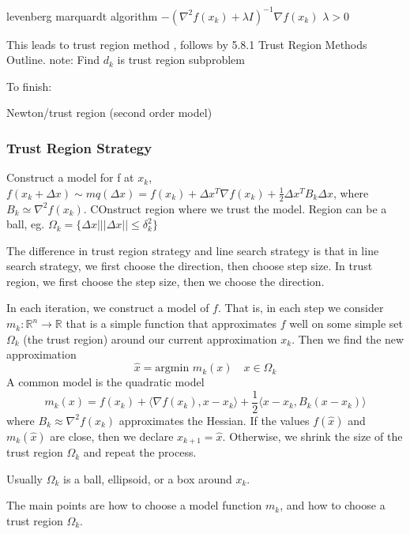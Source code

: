       levenberg marquardt algorithm
  $-(\nabla^2 f(x_k)+\lambda I)^{-1}\nabla f(x_k)$ $\lambda >0$
  \begin{problem}
      This leads to trust region method ,
      follows by 5.8.1 Trust Region Methods Outline.
      note: Find $d_k$ is trust region subproblem
  \end{problem}



To finish:

Newton/trust region (second order model)
\subsubsection{Trust Region Strategy}
\begin{problem}
  Construct a model for f at $x_k$, $f(x_k+\Delta x)\sim mq(\Delta x)=f(x_k)+\Delta x^T\nabla f(x_k)+\frac{1}{2}\Delta x^TB_k\Delta x$,
  where $B_k\simeq \nabla^2 f(x_k)$. COnstruct region where we trust the model. Region can be a ball,
  eg. $\Omega_k=\{\Delta x| ||\Delta x||\leq \delta_k^2\}$
\end{problem}
The difference in trust region strategy and line search strategy is that in line search strategy, we first choose the direction, then choose step size. In trust region, we first choose the step size, then we choose the direction.
\begin{definition}
  In each iteration, we construct a model of $f$. That is, in each step we consider $m_k: \mathbb R^n \to \mathbb R$ that is a simple function that approximates $f$ well on some simple set $\Omega_k$ (the trust region) around our current approximation $x_k$. Then we find the new approximation $$\hat x = \text{argmin } m_k(x) \quad \text{$x \in \Omega_k$}$$
  A common model is the quadratic model $$m_k(x) = f(x_k) + \langle \nabla f(x_k), x - x_k \rangle + \frac{1}{2} \langle x - x_k, B_k(x - x_k) \rangle$$ where $B_k \approx \nabla^2 f(x_k)$ approximates the Hessian. If the values $f(\hat x)$ and $m_k(\hat x)$ are close, then we declare $x_{k+1} = \hat x$. Otherwise, we shrink the size of the trust region $\Omega_k$ and repeat the process.

  Usually $\Omega_k$ is a ball, ellipsoid, or a box around $x_k$.

  The main points are how to choose a model function $m_k$, and how to choose a trust region $\Omega_k$.
\end{definition}





